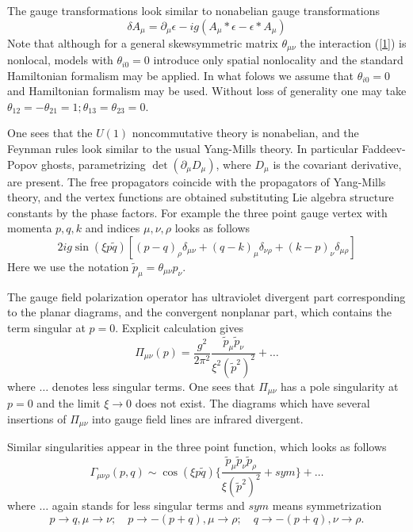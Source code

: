 \documentclass[a4paper,12pt]{article}
\begin{document}
 The gauge transformations look similar to nonabelian gauge
 transformations
 \begin{equation}
\delta A_{\mu}= \partial_{\mu} \epsilon-ig(A_{\mu}* \epsilon-
\epsilon* A_{\mu})
 \label{4}
 \end{equation}
Note that although for a general skewsymmetric matrix $\theta_{\mu \nu}$
the interaction (\ref{1}) is nonlocal, models with $\theta_{i0}=0$
 introduce only spatial nonlocality and the standard Hamiltonian formalism
 may be applied. In what folows we assume that $\theta_{i0}=0$ and
 Hamiltonian formalism may be used. Without loss of generality one
 may take $ \theta_{12}=- \theta_{21}=1; \theta_{13}=
 \theta_{23}=0$.

One sees that the $U(1)$ noncommutative theory is nonabelian, and the
 Feynman rules look similar to the usual Yang-Mills theory. In particular
 Faddeev-Popov ghosts, parametrizing $ \det(\partial_{\mu}D_{\mu})$, where
 $D_{\mu}$ is the covariant derivative, are present. The free propagators
 coincide with the propagators of Yang-Mills theory, and the vertex
 functions are obtained substituting Lie algebra structure
 constants by the phase factors. For example the three point gauge vertex
 with momenta $p, q, k$ and indices $\mu, \nu, \rho$ looks as follows
 \begin{equation}
 2ig \sin(\xi p \tilde{q})[(p-q)_{\rho} \delta_{\mu
 \nu}+(q-k)_{\mu} \delta_{\nu \rho}+(k-p)_{\nu} \delta_{\mu \rho}]
 \label{5}
 \end{equation}
 Here we use the notation $\tilde{p}_{\mu}= \theta_{\mu \nu}p_{\nu}$.

 The gauge field polarization operator has ultraviolet divergent part
 corresponding to the planar diagrams, and the convergent nonplanar
 part, which contains the term singular at $p=0$. Explicit calculation
 gives \begin{equation} \Pi_{\mu \nu}(p)= \frac{g^2}{2 \pi^2}
 \frac{\tilde{p}_{\mu}\tilde{p}_{\nu}}{\xi^2(\tilde{p}^2)^2}+ \ldots
 \label{6} \end{equation}
 where $\ldots$ denotes less singular terms. One sees that $\Pi_{\mu \nu}$
 has a pole singularity at $p=0$ and the limit
 $\xi \rightarrow 0$ does not exist. The diagrams which have several
 insertions of $\Pi_{\mu \nu}$ into gauge field lines are infrared
 divergent.

 Similar singularities appear in the three point function, which looks as
 follows
 \begin{equation}
 \Gamma_{\mu \nu \rho}(p,q) \sim \cos(\xi p \tilde{q})
 \{ \frac{ \tilde{p}_{\mu} \tilde{p}_{\nu}  \tilde{p}_{\rho}}
{\xi(\tilde{p}^2)^2}+ sym \}+ \ldots
 \label{7}
 \end{equation}
 where $\ldots$ again stands for less singular terms and $sym$ means
  symmetrization
 \begin{equation}
 p \rightarrow q,\mu \rightarrow \nu;\quad p \rightarrow -(p+q), \mu
  \rightarrow \rho; \quad q \rightarrow -(p+q), \nu \rightarrow \rho.
 \label{8}
 \end{equation}
\end{document}
